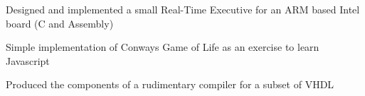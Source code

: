 \documentclass[]{hieudo-build}
\begin{document}
\begin{minipage}[t]{1.0\textwidth}
\descript{}
Designed and implemented a small Real-Time Executive for an ARM based Intel board (C and Assembly)
\sectionsep

\descript{}
Simple implementation of Conways Game of Life as an exercise to learn Javascript
\sectionsep

\descript{}
Produced the components of a rudimentary compiler for a subset of VHDL
\sectionsep






\end{minipage} 
\end{document}
